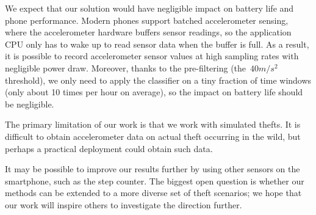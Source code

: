 We expect that our solution would have negligible impact on battery life and phone performance.
Modern phones support batched accelerometer sensing, where the accelerometer hardware buffers sensor readings, so the application CPU only has to wake up to read sensor data when the buffer is full.
As a result, it is possible to record accelerometer sensor values at high sampling rates with negligible power draw.
Moreover, thanks to the pre-filtering (the~$40 m/s^2$ threshold),
we only need to apply the classifier on a tiny fraction of time windows (only about 10 times per hour on average),
so the impact on battery life should be negligible.

The primary limitation of our work is that we work with simulated thefts.
It is difficult to obtain accelerometer data on actual theft occurring in the wild, but perhaps a practical deployment could obtain such data.

It may be possible to improve our results further by using other sensors on the smartphone, such as the step counter.
The biggest open question is whether our methods can be extended to a more diverse set of theft scenarios; we hope that our work will inspire others to investigate the direction further.





% 

\begin{acks}
\begin{comment}
\textcolor{red}{Comment out for double blind review}. 

The authors would like to thank Prakash P. Bhasker and Micah J. Sheller for proivding with the Android sensor monitoring software, Jennider Chen from the Good Research for her assistance on conducting the user study, and Irwin Reyes, David Fifield and Michael McCoyd for giving feedback to our paper drafts. 
This research was conducted at The Intel Science and Technology Center for Secure Computing (http://scrub.cs.berkeley.edu/) at UC Berkeley. 
The work is supported by \textcolor{red}{What Grants and Funds}. 
\end{comment}
\end{acks}
